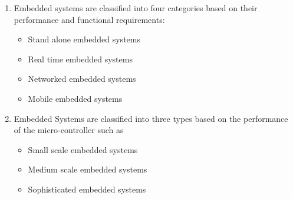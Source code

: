\begin{enumerate}

\item Embedded systems are classified into four categories based on their performance and functional requirements:

\begin{itemize}
  \item Stand alone embedded systems
  \item Real time embedded systems
  \item Networked embedded systems
  \item Mobile embedded systems
\end{itemize}

\newpage
\item Embedded Systems are classified into three types based on the performance of the micro-controller such as

\begin{itemize}
  \item Small scale embedded systems
  \item Medium scale embedded systems
  \item Sophisticated embedded systems
\end{itemize}

\end{enumerate}

